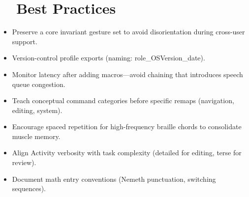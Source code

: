 \section{~~Best Practices}
\label{sec:sr30-best-practices}
\begin{itemize}
	\item Preserve a core invariant gesture set to avoid disorientation during cross-user support.
	\item Version-control profile exports (naming: role\_OSVersion\_date).
	\item Monitor latency after adding macros—avoid chaining that introduces speech queue congestion.
	\item Teach conceptual command categories before specific remaps (navigation, editing, system).
	\item Encourage spaced repetition for high-frequency braille chords to consolidate muscle memory.
	\item Align Activity verbosity with task complexity (detailed for editing, terse for review).
	\item Document math entry conventions (Nemeth punctuation, switching sequences).
\end{itemize}

